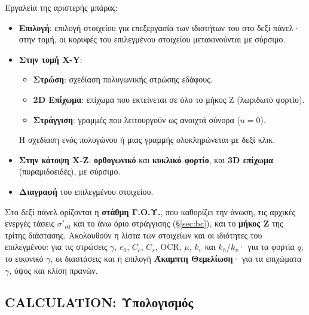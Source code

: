 \documentclass[11pt,a4paper]{article}
\begin{document}
Εργαλεία της αριστερής μπάρας:
\begin{itemize}
  \item \textbf{Επιλογή}: επιλογή στοιχείου για επεξεργασία των ιδιοτήτων του στο δεξί πάνελ· στην τομή, οι κορυφές του επιλεγμένου στοιχείου μετακινούνται με σύρσιμο.
  \item \textbf{Στην τομή X-Y}:
  \begin{itemize}
    \item \textbf{Στρώση}: σχεδίαση πολυγωνικής στρώσης εδάφους.
    \item \textbf{2D Επίχωμα}: επίχωμα που εκτείνεται σε όλο το μήκος Z (λωριδωτό φορτίο).
    \item \textbf{Στράγγιση}: γραμμές που λειτουργούν ως ανοιχτά σύνορα (\mbox{$u = 0$}).
  \end{itemize}
  Η σχεδίαση ενός πολυγώνου ή μιας γραμμής ολοκληρώνεται με δεξί κλικ.
  \item \textbf{Στην κάτοψη X-Z}: \textbf{ορθογωνικό} και \textbf{κυκλικό φορτίο}, και \textbf{3D επίχωμα} (πυραμιδοειδές), με σύρσιμο.
  \item \textbf{Διαγραφή} του επιλεγμένου στοιχείου.
\end{itemize}
Στο δεξί πάνελ ορίζονται η \textbf{στάθμη Γ.Ο.Υ.}, που καθορίζει την άνωση, τις αρχικές ενεργές τάσεις $\sigma'_{v0}$ και το άνω όριο στράγγισης (§\ref{sec:bc}), και το \textbf{μήκος Z} της τρίτης διάστασης. Ακολουθούν η λίστα των στοιχείων και οι ιδιότητες του επιλεγμένου: για τις στρώσεις $\gamma$, $e_0$, $C_c$, $C_s$, OCR, $\mu$, $k_v$ και $k_h/k_v$· για τα φορτία $q$, το εικονικό $\gamma$, οι διαστάσεις και η επιλογή \textbf{Άκαμπτη Θεμελίωση}· για τα επιχώματα $\gamma$, ύψος και κλίση πρανών.

\subsection{CALCULATION: Υπολογισμός}
\end{document}

